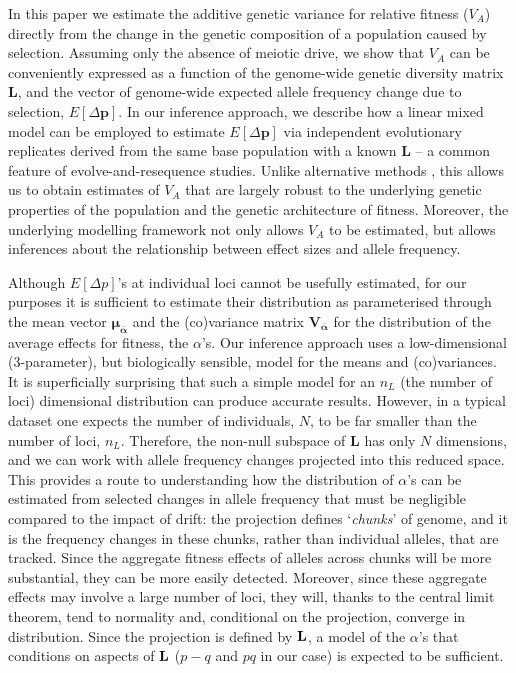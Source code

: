 \documentclass[12pt]{article}
\begin{document}
\begin{bibunit}
In this paper we estimate the additive genetic variance for relative fitness ($V_A$) directly from the change in the genetic composition of a population caused by selection. Assuming only the absence of meiotic drive, we show that $V_A$ can be conveniently expressed as a function of the genome-wide genetic diversity matrix $\textbf{L}$, and the vector of genome-wide expected allele frequency change due to selection, $E[\Delta{\textbf{p}}]$. In our inference approach, we describe how a linear mixed model can be employed to estimate $E[\Delta{\textbf{p}}]$ via independent evolutionary replicates derived from the same base population with a known $\textbf{L}$ -- a common feature of evolve-and-resequence studies.  Unlike alternative methods \citep{buffalo2019linked}, this allows us to obtain estimates of $V_A$ that are largely robust to the underlying genetic properties of the population and the genetic architecture of fitness. Moreover, the underlying modelling framework not only allows $V_A$ to be estimated, but allows inferences about the relationship between effect sizes and allele frequency.    

Although $E[\Delta{p}]$'s at individual loci cannot be usefully estimated, for our purposes it is sufficient to estimate their distribution as parameterised through the mean vector $\boldsymbol{\mu_{\bar{\alpha}}}$ and the (co)variance matrix $\boldsymbol{V_{\bar{\alpha}}}$ for the distribution of the average effects for fitness, the $\alpha$'s. Our inference approach uses a low-dimensional (3-parameter), but biologically sensible, model for the means and (co)variances. It is superficially surprising that such a simple model for an $n_L$ (the number of loci) dimensional distribution can produce accurate results. However, in a typical dataset one expects the number of individuals, $N$, to be far smaller than the number of loci, $n_L$. Therefore, the non-null subspace of $\textbf{L}$ has only $N$ dimensions, and we can work with allele frequency changes projected into this reduced space. This provides a route to understanding how the distribution of $\alpha$'s can be estimated from selected changes in allele frequency that must be negligible compared to the impact of drift: the projection defines `\emph{chunks}' of genome, and it is the frequency changes in these chunks, rather than individual alleles, that are tracked. Since the aggregate fitness effects of alleles across chunks will be more substantial, they can be more easily detected. Moreover, since these aggregate effects may involve a large number of loci, they will, thanks to the central limit theorem, tend to normality and, conditional on the projection, converge in distribution. Since the projection is defined by ${\bf L}$, a model of the $\alpha$'s that conditions on aspects of ${\bf L}$ ($p-q$ and $pq$ in our case) is expected to be sufficient.      


\end{bibunit}
\end{document}
